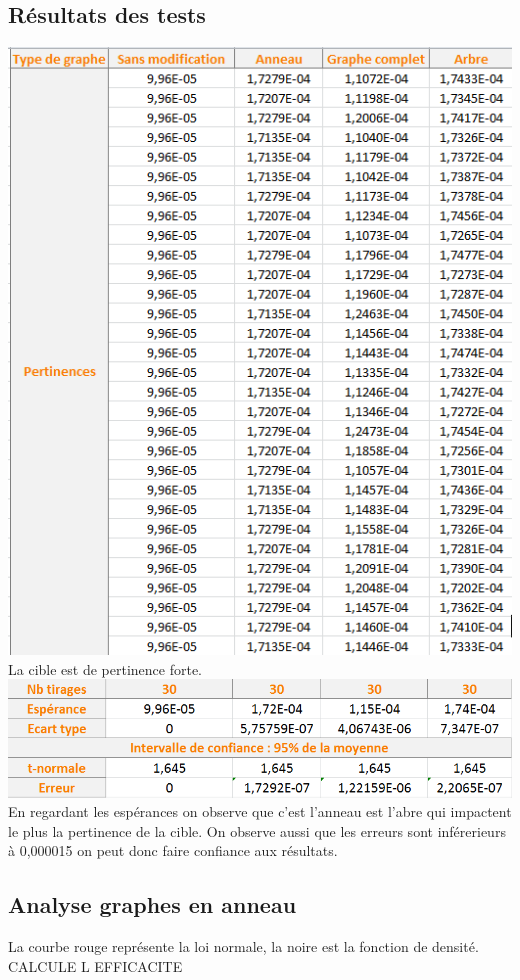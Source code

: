 \documentclass[a4paper,11pt]{article}
\begin{document}
	\subsection{Résultats des tests}
		\includegraphics[scale = 0.5]{Captures/ranking2.PNG}\\
		La cible est de pertinence forte. \\
		\includegraphics[scale = 0.5]{Captures/ranking3.PNG}\\
		En regardant les espérances on observe que c'est l'anneau est l'abre qui impactent le plus la pertinence de la cible.
		On observe aussi que les erreurs sont inférerieurs à 0,000015 on peut donc faire confiance aux résultats.\\

	\subsection{Analyse graphes en anneau}
		
		La courbe rouge représente la loi normale, la noire est la fonction de densité. 
		CALCULE L EFFICACITE
\end{document}

